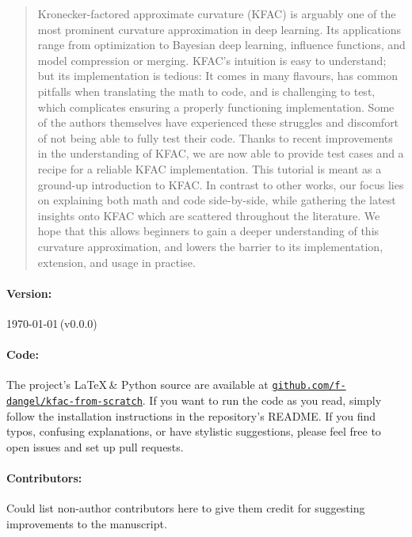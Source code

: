 \begin{abstract}
  Kronecker-factored approximate curvature (KFAC) is arguably one of the most prominent curvature approximation in deep learning.
  Its applications range from optimization to Bayesian deep learning, influence functions, and model compression or merging.
  KFAC's intuition is easy to understand; but its implementation is tedious: It comes in many flavours, has common pitfalls when translating the math to code, and is challenging to test, which complicates ensuring a properly functioning implementation.
  Some of the authors themselves have experienced these struggles and discomfort of not being able to fully test their code.
  Thanks to recent improvements in the understanding of KFAC, we are now able to provide test cases and a recipe for a reliable KFAC implementation.
  This tutorial is meant as a ground-up introduction to KFAC.
  In contrast to other works, our focus lies on explaining both math and code side-by-side, while gathering the latest insights onto KFAC which are scattered throughout the literature.
  We hope that this allows beginners to gain a deeper understanding of this curvature approximation, and lowers the barrier to its implementation, extension, and usage in practise.
\end{abstract}

\vfill

\paragraph{Version:} \today\,(v0.0.0)

\paragraph{Code:} The project's \LaTeX\,\& Python source are available at \href{\repourl}{\texttt{github.com/f-dangel/kfac-from-scratch}}. If you want to run the code as you read, simply follow the installation instructions in the repository's README. If you find typos, confusing explanations, or have stylistic suggestions, please feel free to open issues and set up pull requests.

\paragraph{Contributors:} Could list non-author contributors here to give them credit for suggesting improvements to the manuscript.
\vspace{\baselineskip}

